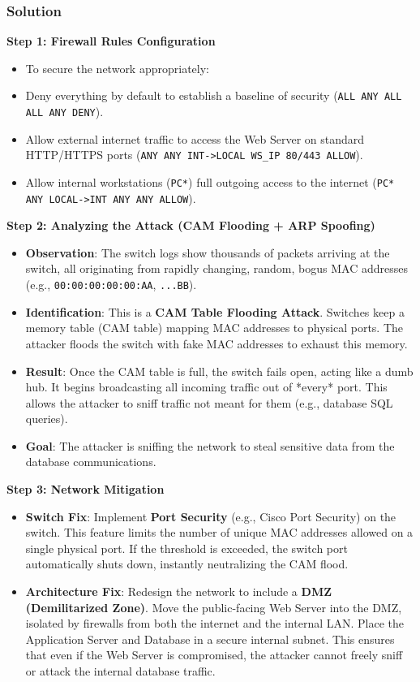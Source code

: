 \documentclass{article}
\begin{document}
\subsubsection*{Solution}
\textbf{Step 1: Firewall Rules Configuration}
\begin{itemize}
    \item To secure the network appropriately:
    \item[\textbf{1.}] Deny everything by default to establish a baseline of security (\texttt{ALL ANY ALL ALL ANY DENY}).
    \item[\textbf{2.}] Allow external internet traffic to access the Web Server on standard HTTP/HTTPS ports (\texttt{ANY ANY INT->LOCAL WS\_IP 80/443 ALLOW}).
    \item[\textbf{3.}] Allow internal workstations (\texttt{PC*}) full outgoing access to the internet (\texttt{PC* ANY LOCAL->INT ANY ANY ALLOW}).

\end{itemize}
\textbf{Step 2: Analyzing the Attack (CAM Flooding + ARP Spoofing)}
\begin{itemize}
    \item \textbf{Observation}: The switch logs show thousands of packets arriving at the switch, all originating from rapidly changing, random, bogus MAC addresses (e.g., \texttt{00:00:00:00:00:AA}, \texttt{...BB}).
    \item \textbf{Identification}: This is a \textbf{CAM Table Flooding Attack}. Switches keep a memory table (CAM table) mapping MAC addresses to physical ports. The attacker floods the switch with fake MAC addresses to exhaust this memory.
    \item \textbf{Result}: Once the CAM table is full, the switch fails open, acting like a dumb hub. It begins broadcasting all incoming traffic out of *every* port. This allows the attacker to sniff traffic not meant for them (e.g., database SQL queries).
    \item \textbf{Goal}: The attacker is sniffing the network to steal sensitive data from the database communications.

\end{itemize}
\textbf{Step 3: Network Mitigation}
\begin{itemize}
    \item \textbf{Switch Fix}: Implement \textbf{Port Security} (e.g., Cisco Port Security) on the switch. This feature limits the number of unique MAC addresses allowed on a single physical port. If the threshold is exceeded, the switch port automatically shuts down, instantly neutralizing the CAM flood.
    \item \textbf{Architecture Fix}: Redesign the network to include a \textbf{DMZ (Demilitarized Zone)}. Move the public-facing Web Server into the DMZ, isolated by firewalls from both the internet and the internal LAN. Place the Application Server and Database in a secure internal subnet. This ensures that even if the Web Server is compromised, the attacker cannot freely sniff or attack the internal database traffic.
\end{itemize}
\end{document}
